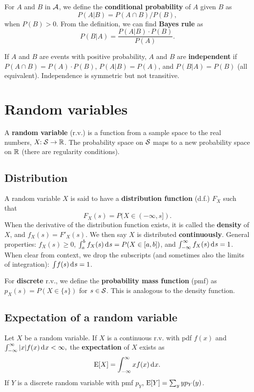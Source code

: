 \documentclass[twoside]{article}
\begin{document}
For $A$ and $B$ in $\mathcal{A}$, we define the \textbf{conditional probability} of $A$ given $B$
as \[ P(A|B) = P(A\cap B)/P(B),\] when $P(B)>0$. From the definition, we can find 
\textbf{Bayes rule}
as 
\[ P(B|A) = \frac{ P(A|B)\cdot P(B)}{P(A)}.\]

If $A$ and $B$ are events with positive probability, $A$ and $B$ are \textbf{independent} if
$P(A\cap B) = P(A)\cdot P(B)$, $P(A|B)=P(A)$, and $P(B|A)=P(B)$ (all equivalent). Independence
is symmetric but not transitive.

\section{Random variables}

A \textbf{random variable}  (r.v.) is a function from a sample space to the real numbers,
$X\!\!: \mathcal{S} \rightarrow \mathbb{R}$. The probability space on $\mathcal{S}$ maps to a new
probability space on $\mathbb{R}$ (there are regularity conditions). 



\subsection{Distribution}
A random variable $X$ is said to have a \textbf{distribution function} (d.f.) $F_X$
such that \[ F_X(s) = P( X\in (-\infty, s]).\] When the derivative of the
distribution function exists, it is called the \textbf{density} of $X$, and
$f_X(s)=F'_X(s)$. We then say $X$ is distributed \textbf{continuously}. General
properties: $f_X(s)\geq0$, $\int_a^b f_X(s)\rd s = P(X\in[a,b])$, and
$\int_{-\infty}^\infty f_X(s) \rd s = 1$. When clear from context, we drop the
subscripts (and sometimes also the limits of integration): $\int\! f(s)\rd s=1$.

For \textbf{discrete} r.v., we define the \textbf{probability mass function} (pmf) as
$p_X(s) = P(X\in\{s\})$ for $s\in\mathcal{S}$. This is analogous to the density function.

\subsection{Expectation of a random variable}
Let $X$ be a random variable. If $X$ is a continuous r.v.
with pdf $f(x)$ and 
\(\int_{-\infty}^\infty |x|f(x) \rd x < \infty,\)
the \textbf{expectation} of $X$ exists as  
\[\E[X] = \int_{-\infty}^\infty xf(x) \rd x.\]
If $Y$ is a discrete random variable with pmf $p_Y$, 
$\operatorname{E}[Y]=\sum_y yp_Y(y)$.
\end{document}

